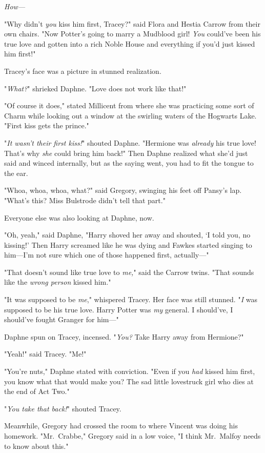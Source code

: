 \emph{How---}

"Why didn't \emph{you} kiss him first, Tracey?" said Flora and Hestia Carrow
from their own chairs. "Now Potter's going to marry a Mudblood girl! \emph{You}
could've been his true love and gotten into a rich Noble House and everything
if you'd just kissed him first!"

Tracey's face was a picture in stunned realization.

"\emph{What?}" shrieked Daphne. "Love does not work like that!"

"Of course it does," stated Millicent from where she was practicing some sort
of Charm while looking out a window at the swirling waters of the Hogwarts
Lake. "First kiss gets the prince."

"\emph{It wasn't their first kiss!}" shouted Daphne. "Hermione was
\emph{already} his true love! That's why \emph{she} could bring him back!" Then
Daphne realized what she'd just said and winced internally, but as the saying
went, you had to fit the tongue to the ear.

"Whoa, whoa, whoa, what?" said Gregory, swinging his feet off Pansy's lap.
"What's this? Miss Bulstrode didn't tell that part."

Everyone else was also looking at Daphne, now.

"Oh, yeah," said Daphne, "Harry shoved her away and shouted, `I told you, no
kissing!' Then Harry screamed like he was dying and Fawkes started singing to
him---I'm not sure which one of those happened first, actually\mbox{---}"

"That doesn't sound like true love to \emph{me,}" said the Carrow twins. "That
sounds like the \emph{wrong person} kissed him."

"It was supposed to be \emph{me}," whispered Tracey. Her face was still
stunned. "\emph{I} was supposed to be his true love. Harry Potter was \emph{my}
general. I should've, I should've fought Granger for him\mbox{---}"

Daphne spun on Tracey, incensed. "\emph{You?} Take Harry away from Hermione?"

"Yeah!" said Tracey. "Me!"

"You're nuts," Daphne stated with conviction. "Even if you \emph{had} kissed
him first, you know what that would make you? The sad little lovestruck girl
who dies at the end of Act Two."

"\emph{You take that back!}" shouted Tracey.

Meanwhile, Gregory had crossed the room to where Vincent was doing his
homework. "Mr.~Crabbe," Gregory said in a low voice, "I think Mr.~Malfoy needs
to know about this."
\sbreak
\vspace{-2\baselineskip}
